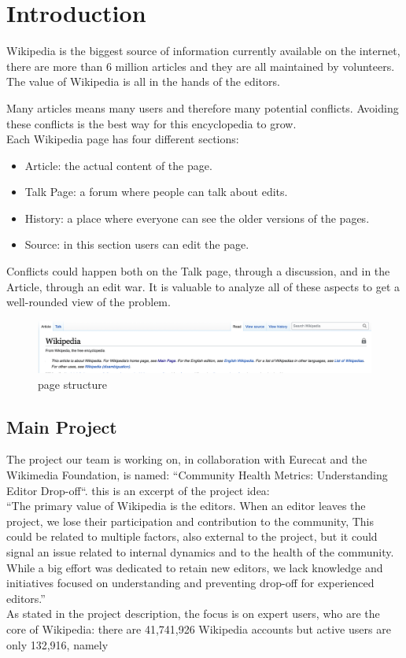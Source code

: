 \chapter{Introduction}
Wikipedia  is the biggest source of information currently available on the internet, there are more
than 6 million articles and they are all maintained by volunteers. The value of Wikipedia is all in
the hands of the editors.

Many articles means many users and therefore many potential conflicts. Avoiding these conflicts is
the best way for this encyclopedia to grow. \\ 
Each Wikipedia page has four different sections:  
\begin{itemize}
    \item Article: the actual content of the page.
    \item Talk Page: a forum where people can talk about edits. 
    \item History: a place where everyone can see the older versions of the pages.
    \item Source: in this section users can edit the page. 
\end{itemize}

Conflicts could happen both on the Talk page, through a discussion, and in the Article, through an
edit war. It is valuable to analyze all of these aspects to get a well-rounded view of the problem.

\begin{figure}
    \centering
    \includegraphics[width=1\textwidth]{./chapters/01/assets/wikipedia_page.png}
    \caption{page structure}
    \label{fig:page}
\end{figure}

\section{Main Project}
\label{sec:Main Project}
The project our team is working on, in collaboration with Eurecat and the Wikimedia Foundation,
is named: “Community Health Metrics: Understanding Editor Drop-off“. this is an excerpt of the
project idea: \\

“The primary value of Wikipedia is the editors. When an editor leaves the project, we lose their
participation and contribution to the community, This could be related to multiple factors, also
external to the project, but it could signal an issue related to internal dynamics and to the health
of the community. While a big effort was dedicated to retain new editors, we lack knowledge and
initiatives focused on understanding and preventing drop-off for experienced editors.”
\\
As stated in the project description, the focus is on expert users, who are the core of Wikipedia:
there are 41,741,926 Wikipedia accounts but active users are only 132,916, namely%

